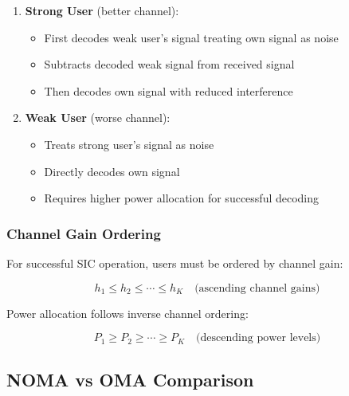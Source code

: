 \documentclass[11pt,a4paper]{article}
\begin{document}
\begin{enumerate}
    \item \textbf{Strong User} (better channel): 
    \begin{itemize}
        \item First decodes weak user's signal treating own signal as noise
        \item Subtracts decoded weak signal from received signal
        \item Then decodes own signal with reduced interference
    \end{itemize}
    \item \textbf{Weak User} (worse channel):
    \begin{itemize}
        \item Treats strong user's signal as noise
        \item Directly decodes own signal
        \item Requires higher power allocation for successful decoding
    \end{itemize}
\end{enumerate}

\subsubsection{Channel Gain Ordering}

For successful SIC operation, users must be ordered by channel gain:

\begin{equation}
h_1 \leq h_2 \leq \cdots \leq h_K \quad \text{(ascending channel gains)}
\end{equation}

Power allocation follows inverse channel ordering:

\begin{equation}
P_1 \geq P_2 \geq \cdots \geq P_K \quad \text{(descending power levels)}
\end{equation}

\subsection{NOMA vs OMA Comparison}
\end{document}
